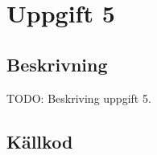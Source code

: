 \section{Uppgift 5}\label{uppgift-5}

\subsection{Beskrivning}
TODO: Beskriving uppgift 5.

\subsection{Källkod}\label{uppgift-5_src}
\inputminted[]{java}{../src/Lab1Uppg05.java}

